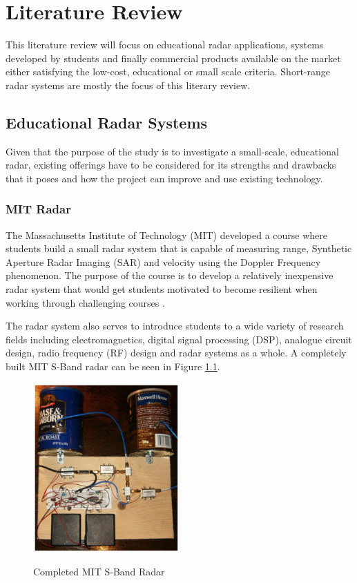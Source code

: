 \chapter{Literature Review}\label{chap:Literature Review}

This literature review will focus on educational radar applications, systems developed by students and finally commercial products available on the market either satisfying the low-cost, educational or small scale criteria. Short-range radar systems are mostly the focus of this literary review.

\section{Educational Radar Systems}
Given that the purpose of the study is to investigate a small-scale, educational radar, existing offerings have to be considered for its strengths and drawbacks that it poses and how the project can improve and use existing technology.
\subsection{MIT Radar}
The Massachusetts Institute of Technology (MIT) developed a course where students build a small radar system that is capable of measuring range, Synthetic Aperture Radar Imaging (SAR) and velocity using the Doppler Frequency phenomenon. The purpose of the course is to develop a relatively inexpensive radar system that would get students motivated to become resilient when working through challenging courses \cite{charvat_mit_2012}.

The radar system also serves to introduce students to a wide variety of research fields including electromagnetics, digital signal processing (DSP), analogue circuit design, radio frequency (RF) design and radar systems as a whole. A completely built MIT S-Band radar can be seen in Figure \ref{MITRadar}.
\begin{figure}[h!]
    \centering
    \includegraphics[width = 0.5\textwidth]{images/MITRadar.pdf}
    \caption{Completed MIT S-Band Radar}\label{MITRadar}\cite{charvat_mit_2012}
\end{figure}


